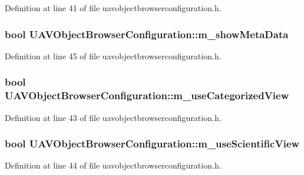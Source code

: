 \-Definition at line 41 of file uavobjectbrowserconfiguration.\-h.

\hypertarget{group___u_a_v_object_browser_plugin_ga6ae11b3871f2da133017aeffa97aaa0b}{
\subsubsection[{m\-\_\-show\-Meta\-Data}]{\setlength{\rightskip}{0pt plus 5cm}bool {\bf \-U\-A\-V\-Object\-Browser\-Configuration\-::m\-\_\-show\-Meta\-Data}}}\label{group___u_a_v_object_browser_plugin_ga6ae11b3871f2da133017aeffa97aaa0b}


\-Definition at line 45 of file uavobjectbrowserconfiguration.\-h.

\hypertarget{group___u_a_v_object_browser_plugin_ga5e0ce819c5383cf9b01ec73c887f67f8}{
\subsubsection[{m\-\_\-use\-Categorized\-View}]{\setlength{\rightskip}{0pt plus 5cm}bool {\bf \-U\-A\-V\-Object\-Browser\-Configuration\-::m\-\_\-use\-Categorized\-View}}}\label{group___u_a_v_object_browser_plugin_ga5e0ce819c5383cf9b01ec73c887f67f8}


\-Definition at line 43 of file uavobjectbrowserconfiguration.\-h.

\hypertarget{group___u_a_v_object_browser_plugin_ga45e17799029628f880291ec2324473a5}{
\subsubsection[{m\-\_\-use\-Scientific\-View}]{\setlength{\rightskip}{0pt plus 5cm}bool {\bf \-U\-A\-V\-Object\-Browser\-Configuration\-::m\-\_\-use\-Scientific\-View}}}\label{group___u_a_v_object_browser_plugin_ga45e17799029628f880291ec2324473a5}


\-Definition at line 44 of file uavobjectbrowserconfiguration.\-h.

